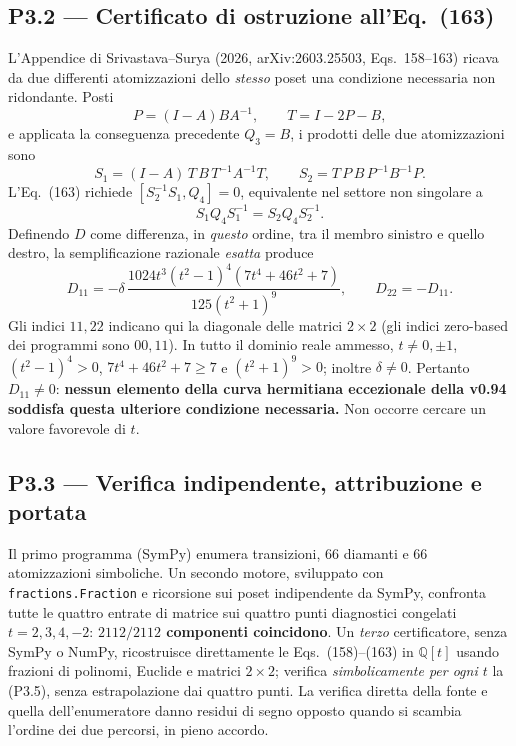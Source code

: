 \documentclass[11pt,a4paper]{article}
\begin{document}
\subsection*{P3.2 --- Certificato di ostruzione all'Eq.~(163)}
L'Appendice di Srivastava--Surya (2026, arXiv:2603.25503, Eqs.~158--163) ricava da due differenti atomizzazioni dello \emph{stesso} poset una condizione necessaria non ridondante. Posti
\begin{equation}
 P=(I-A)BA^{-1},\qquad T=I-2P-B,
 \tag{P3.2}
\end{equation}
e applicata la conseguenza precedente $Q_3=B$, i prodotti delle due atomizzazioni sono
\begin{equation}
 S_1=(I-A)\,T\,B\,T^{-1}A^{-1}T,\qquad
 S_2=T\,P\,B\,P^{-1}B^{-1}P.
 \tag{P3.3}
\end{equation}
L'Eq.~(163) richiede $[S_2^{-1}S_1,Q_4]=0$, equivalente nel settore non singolare a
\begin{equation}
 S_1Q_4S_1^{-1}=S_2Q_4S_2^{-1}.
 \tag{P3.4}
\end{equation}
Definendo $D$ come differenza, in \emph{questo} ordine, tra il membro sinistro e quello destro, la semplificazione razionale \emph{esatta} produce
\begin{equation}
\boxed{D_{11}=-\delta\,\frac{1024t^3(t^2-1)^4(7t^4+46t^2+7)}{125(t^2+1)^9},\qquad D_{22}=-D_{11}.}
\tag{P3.5}
\end{equation}
Gli indici $11,22$ indicano qui la diagonale delle matrici $2\times2$ (gli indici zero-based dei programmi sono $00,11$). In tutto il dominio reale ammesso, $t\ne0,\pm1$, $(t^2-1)^4>0$, $7t^4+46t^2+7\ge7$ e $(t^2+1)^9>0$; inoltre $\delta\ne0$. Pertanto $D_{11}\ne0$: \textbf{nessun elemento della curva hermitiana eccezionale della v0.94 soddisfa questa ulteriore condizione necessaria.} Non occorre cercare un valore favorevole di $t$.

\clearpage
\subsection*{P3.3 --- Verifica indipendente, attribuzione e portata}
Il primo programma (SymPy) enumera transizioni, $66$ diamanti e $66$ atomizzazioni simboliche. Un secondo motore, sviluppato con \texttt{fractions.Fraction} e ricorsione sui poset indipendente da SymPy, confronta tutte le quattro entrate di matrice sui quattro punti diagnostici congelati $t=2,3,4,-2$: \textbf{$2112/2112$ componenti coincidono}. Un \emph{terzo} certificatore, senza SymPy o NumPy, ricostruisce direttamente le Eqs.~(158)--(163) in $\mathbb Q[t]$ usando frazioni di polinomi, Euclide e matrici $2\times2$; verifica \emph{simbolicamente per ogni $t$} la (P3.5), senza estrapolazione dai quattro punti. La verifica diretta della fonte e quella dell'enumeratore danno residui di segno opposto quando si scambia l'ordine dei due percorsi, in pieno accordo.
\end{document}
